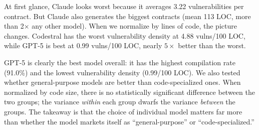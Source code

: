 \documentclass[11pt]{article}
\begin{document}
\begin{table}[H]
\centering
\caption{Per-LLM Vulnerability Statistics (Compiled Contracts Only)}
\label{tab:llm_vulns}
\end{table}

At first glance, Claude looks worst because it averages 3.22 vulnerabilities per contract. But Claude also generates the biggest contracts (mean 113 LOC, more than 2$\times$ any other model). When we normalize by lines of code, the picture changes. Codestral has the worst vulnerability density at 4.88 vulns/100 LOC, while GPT-5 is best at 0.99 vulns/100 LOC, nearly $5\times$ better than the worst.

GPT-5 is clearly the best model overall: it has the highest compilation rate (91.0\%) and the lowest vulnerability density (0.99/100 LOC). We also tested whether general-purpose models are better than code-specialized ones. When normalized by code size, there is no statistically significant difference between the two groups; the variance \emph{within} each group dwarfs the variance \emph{between} the groups. The takeaway is that the choice of individual model matters far more than whether the model markets itself as ``general-purpose'' or ``code-specialized.''
\end{document}

